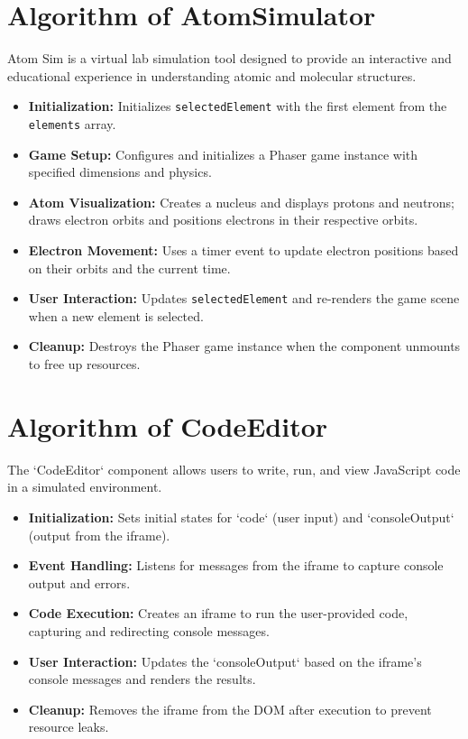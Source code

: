 \section{Algorithm of AtomSimulator}
Atom Sim is a virtual lab simulation tool designed to provide an interactive and educational experience in understanding atomic and molecular structures.
\begin{itemize}
    \item \textbf{Initialization:} Initializes \texttt{selectedElement} with the first element from the \texttt{elements} array.
    \item \textbf{Game Setup:} Configures and initializes a Phaser game instance with specified dimensions and physics.
    \item \textbf{Atom Visualization:} Creates a nucleus and displays protons and neutrons; draws electron orbits and positions electrons in their respective orbits.
    \item \textbf{Electron Movement:} Uses a timer event to update electron positions based on their orbits and the current time.
    \item \textbf{User Interaction:} Updates \texttt{selectedElement} and re-renders the game scene when a new element is selected.
    \item \textbf{Cleanup:} Destroys the Phaser game instance when the component unmounts to free up resources.
\end{itemize}


\section{Algorithm of CodeEditor}
The `CodeEditor` component allows users to write, run, and view JavaScript code in a simulated environment.
\begin{itemize}
    \item \textbf{Initialization:} Sets initial states for `code` (user input) and `consoleOutput` (output from the iframe).
    \item \textbf{Event Handling:} Listens for messages from the iframe to capture console output and errors.
    \item \textbf{Code Execution:} Creates an iframe to run the user-provided code, capturing and redirecting console messages.
    \item \textbf{User Interaction:} Updates the `consoleOutput` based on the iframe’s console messages and renders the results.
    \item \textbf{Cleanup:} Removes the iframe from the DOM after execution to prevent resource leaks.
\end{itemize}
